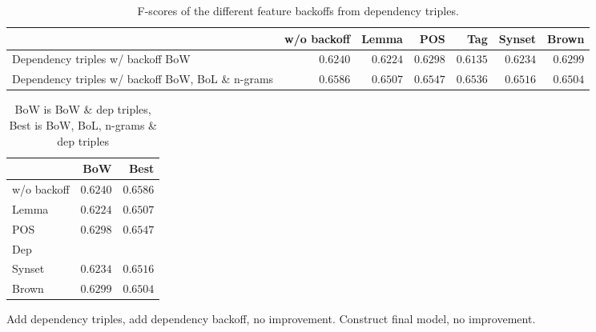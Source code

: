 \documentclass[11pt,letterpaper]{article}
\begin{document}
\begin{table*}
  \begin{center}
    \begin{tabular}{lrrrrrr}
      \toprule
      
      & w/o backoff & Lemma & POS & Tag & Synset & Brown\\
      \midrule
      Dependency triples w/ backoff  BoW & $0.6240$ &  $0.6224$ & $0.6298$ & $0.6135$ & $0.6234$ & $0.6299$  \\ %
      Dependency triples w/ backoff BoW, BoL \& n-grams & $0.6586$ & $0.6507$ & $0.6547$ & $0.6536$ & $0.6516$ & $0.6504$\\ %
      
      \bottomrule

    \end{tabular}
  \end{center}
  \caption{F-scores of the different feature backoffs from dependency triples.}
  \label{tab:firsttriplebackoff}
\end{table*}

\begin{table}
  \begin{center}
    \begin{tabular}{lrr}
      \toprule
      
      
      & BoW & Best\\
      \midrule
      w/o backoff & $0.6240$ & $0.6586$ \\
      Lemma & $0.6224$ & $0.6507$ \\
      POS & $0.6298$ & $0.6547$ \\ %
      Dep \\
      Synset & $0.6234$ & $0.6516$  \\ %
      Brown & $0.6299$ & $0.6504$ \\ %
      
      
      
      \bottomrule

    \end{tabular}
  \end{center}
  \caption{BoW is BoW \& dep triples, Best is BoW, BoL, n-grams \& dep triples}
  \label{tab:firsttriplebackoff}
\end{table}

Add dependency triples, add dependency backoff, no improvement. Construct final model, no improvement.
\end{document}
